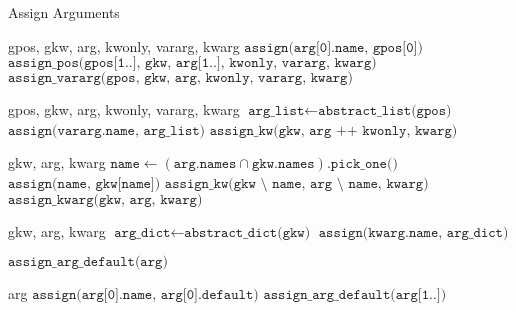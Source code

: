 \documentclass[a4paper, 16pt, oneside]{Thesis}
\begin{document}
\begin{algorithm}
    \caption{Assign Arguments}\label{alg:arg}
    \begin{algorithmic}[1]
         {gpos, gkw, arg, kwonly, vararg, kwarg}
            \State $\texttt{assign(arg[0].name, gpos[0])}$
            \State $\texttt{assign\_pos(gpos[1..], gkw, arg[1..], kwonly, vararg, kwarg)}$
          \Else
            \State $\texttt{assign\_vararg(gpos, gkw, arg, kwonly, vararg, kwarg)}$
          \EndIf
        \EndFunction

        \State

         {gpos, gkw, arg, kwonly, vararg, kwarg}
            \State $\texttt{arg\_list} \gets \texttt{abstract\_list(gpos)}$
            \State $\texttt{assign(vararg.name, arg\_list)}$
          \EndIf
          \State $\texttt{assign\_kw(gkw, arg ++ kwonly, kwarg)}$
        \EndFunction

        \State

         {gkw, arg, kwarg}
            \State $\texttt{name} \gets (\texttt{arg.names} \cap \texttt{gkw.names})\texttt{.pick\_one()}$
            \State $\texttt{assign(name, gkw[name])}$
            \State $\texttt{assign\_kw(gkw $\setminus$ name, arg $\setminus$ name, kwarg)}$
          \Else
            \State $\texttt{assign\_kwarg(gkw, arg, kwarg)}$
          \EndIf
        \EndFunction

        \State

         {gkw, arg, kwarg}
            \State $\texttt{arg\_dict} \gets \texttt{abstract\_dict(gkw)}$
            \State $\texttt{assign(kwarg.name, arg\_dict)}$
          \EndIf

          \State $\texttt{assign\_arg\_default(arg)}$
        \EndFunction

        \State

         {arg}
            \State $\texttt{assign(arg[0].name, arg[0].default)}$
            \State $\texttt{assign\_arg\_default(arg[1..])}$
          \EndIf
        \EndFunction
    \end{algorithmic}
\end{algorithm}
\end{document}
